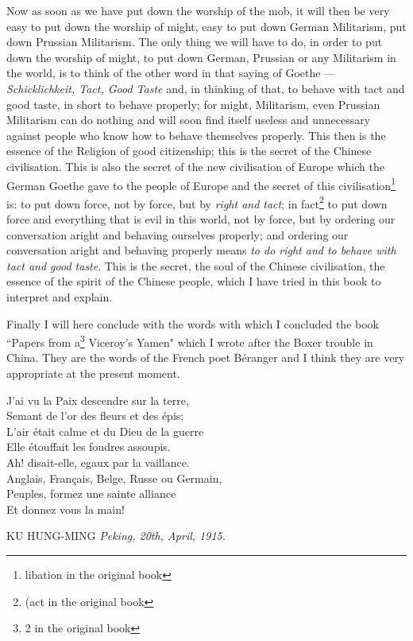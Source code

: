 Now as soon as we have put down the worship of the mob, it will then be very easy to put down the worship of might, easy to put down German Militarism, put down Prussian Militarism.
The only thing we will have to do, in order to put down the worship of might, to put down German, Prussian or any Militarism in the world, is to think of the other word in that saying of Goethe --- \emph{Schicklichkeit, Tact, Good Taste} and, in thinking of that, to behave with tact and good taste, in short to behave properly; for might, Militarism, even Prussian Militarism can do nothing and will soon find itself useless and unnecessary against people who know how to behave themselves properly.
This then is the essence of the Religion of good citizenship; this is the secret of the Chinese civilisation.
This is also the secret of the new civilisation of Europe which the German Goethe gave to the people of Europe and the secret of this civilisation\footnote{libation in the original book} is: to put down force, not by force, but by \emph{right and tact}; in fact\footnote{(act in the original book} to put down force and everything that is evil in this world, not by force, but by ordering our conversation aright and behaving ourselves properly; and ordering our conversation aright and behaving properly means \emph{to do right and to behave with tact and good taste}\cite{num10}. 
This is the secret, the soul of the Chinese civilisation, the essence of the spirit of the Chinese people, which I have tried in this book to interpret and explain.

Finally I will here conclude with the words with which I concluded the book ``Papers from a\footnote{2 in the original book} Viceroy's Yamen" which I wrote after the Boxer trouble in China.
They are the words of the French poet B\'eranger and I think they are very appropriate at the present moment.
\begin{center}
    J'ai vu la Paix descendre sur la terre,\\
    Semant de l'or des fleurs et des \'epis;\\
    L'air \'etait calme et du Dieu de la guerre\\
    Elle \'etouffait les foudres assoupis.\\
    Ah! disait-elle, egaux par la vaillance.\\
    Anglais, Fran\c{c}ais, Belge, Russe ou Germain,\\
    Peuples, formez une sainte alliance\\
    Et donnez vous la main!\\
\end{center}

\vspace{2cm}
\hfill KU HUNG-MING
\vspace{3cm}
\emph{Peking, 20th, April, 1915.}

